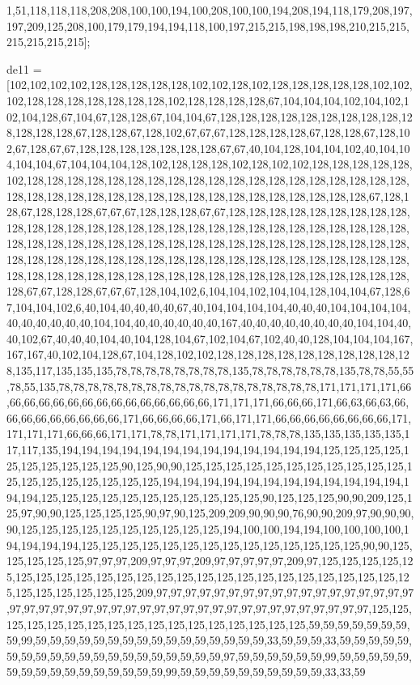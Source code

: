 1,51,118,118,118,208,208,100,100,194,100,208,100,100,194,208,194,118,179,208,197,197,209,125,208,100,179,179,194,194,118,100,197,215,215,198,198,198,210,215,215,215,215,215,215];

de11 = [102,102,102,102,128,128,128,128,128,102,102,128,102,128,128,128,128,128,102,102,102,128,128,128,128,128,128,128,102,128,128,128,128,67,104,104,104,102,104,102,102,104,128,67,104,67,128,128,67,104,104,67,128,128,128,128,128,128,128,128,128,128,128,128,128,67,128,128,67,128,102,67,67,67,128,128,128,128,67,128,128,67,128,102,67,128,67,67,128,128,128,128,128,128,128,67,67,40,104,128,104,104,102,40,104,104,104,104,67,104,104,104,128,102,128,128,128,102,128,102,102,128,128,128,128,128,102,128,128,128,128,128,128,128,128,128,128,128,128,128,128,128,128,128,128,128,128,128,128,128,128,128,128,128,128,128,128,128,128,128,128,128,128,128,67,128,128,67,128,128,128,67,67,67,128,128,128,67,67,128,128,128,128,128,128,128,128,128,128,128,128,128,128,128,128,128,128,128,128,128,128,128,128,128,128,128,128,128,128,128,128,128,128,128,128,128,128,128,128,128,128,128,128,128,128,128,128,128,128,128,128,128,128,128,128,128,128,128,128,128,128,128,128,128,128,128,128,128,128,128,128,128,128,128,128,128,128,128,128,128,128,128,128,128,128,128,128,128,128,67,67,128,128,67,67,67,128,104,102,6,104,104,102,104,104,128,104,104,67,128,67,104,104,102,6,40,104,40,40,40,40,67,40,104,104,104,104,40,40,40,104,104,104,104,40,40,40,40,40,40,104,104,40,40,40,40,40,40,167,40,40,40,40,40,40,40,40,104,104,40,40,102,67,40,40,40,104,40,104,128,104,67,102,104,67,102,40,40,128,104,104,104,167,167,167,40,102,104,128,67,104,128,102,102,128,128,128,128,128,128,128,128,128,128,135,117,135,135,135,78,78,78,78,78,78,78,78,135,78,78,78,78,78,78,135,78,78,55,55,78,55,135,78,78,78,78,78,78,78,78,78,78,78,78,78,78,78,78,78,78,171,171,171,171,66,66,66,66,66,66,66,66,66,66,66,66,66,66,66,171,171,171,66,66,66,171,66,63,66,63,66,66,66,66,66,66,66,66,66,171,66,66,66,66,171,66,171,171,66,66,66,66,66,66,66,66,171,171,171,171,66,66,66,171,171,78,78,171,171,171,171,78,78,78,135,135,135,135,135,117,117,135,194,194,194,194,194,194,194,194,194,194,194,194,194,125,125,125,125,125,125,125,125,125,125,90,125,90,90,125,125,125,125,125,125,125,125,125,125,125,125,125,125,125,125,125,125,125,194,194,194,194,194,194,194,194,194,194,194,194,194,194,125,125,125,125,125,125,125,125,125,125,125,90,125,125,125,90,90,209,125,125,97,90,90,125,125,125,125,90,97,90,125,209,209,90,90,90,76,90,90,209,97,90,90,90,90,125,125,125,125,125,125,125,125,125,125,194,100,100,194,194,100,100,100,100,194,194,194,194,125,125,125,125,125,125,125,125,125,125,125,125,125,125,90,90,125,125,125,125,125,97,97,97,209,97,97,97,209,97,97,97,97,97,209,97,125,125,125,125,125,125,125,125,125,125,125,125,125,125,125,125,125,125,125,125,125,125,125,125,125,125,125,125,125,125,125,209,97,97,97,97,97,97,97,97,97,97,97,97,97,97,97,97,97,97,97,97,97,97,97,97,97,97,97,97,97,97,97,97,97,97,97,97,97,97,97,97,97,97,97,125,125,125,125,125,125,125,125,125,125,125,125,125,125,125,125,125,59,59,59,59,59,59,59,59,99,59,59,59,59,59,59,59,59,59,59,59,59,59,59,59,59,33,59,59,59,33,59,59,59,59,59,59,59,59,59,59,59,59,59,59,59,59,59,59,59,59,97,59,59,59,59,59,59,99,59,59,59,59,59,59,59,59,59,59,59,59,59,59,59,59,99,59,59,59,59,59,59,59,59,59,59,33,33,59